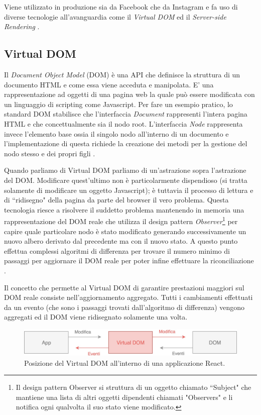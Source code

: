 Viene utilizzato in produzione sia da Facebook che da Instagram e fa uso di diverse tecnologie all'avanguardia come il \textit{Virtual DOM} ed il \textit{Server-side Rendering} \cite{WheelerOnReact}.

\subsection{Virtual DOM}
Il  \textit{Document Object Model} (DOM) è una API che definisce la struttura di un documento HTML e come essa viene acceduta e manipolata. E' una rappresentazione ad oggetti di una pagina web la quale può essere modificata con un linguaggio di scripting come Javascript.
Per fare un esempio pratico, lo standard DOM stabilisce che l'interfaccia \textit{Document} rappresenti l'intera pagina HTML e che concettualmente sia il nodo root. L'interfaccia \textit{Node} rappresenta invece l'elemento base ossia il singolo nodo all'interno di un documento e l'implementazione di questa richiede la creazione dei metodi per la gestione del nodo stesso e dei propri figli \cite{HWRWhatIsDOM}.

Quando parliamo di Virtual DOM parliamo di un'astrazione sopra l'astrazione del DOM. Modificare quest'ultimo non è particolarmente dispendioso (si tratta solamente di modificare un oggetto Javascript); è tuttavia il processo di lettura e di “ridisegno" della pagina da parte del browser il vero problema. Questa tecnologia riesce a risolvere il suddetto problema mantenendo in memoria una rappresentazione del DOM reale che utilizza il design pattern \textit{Observer}\footnote{Il design pattern Observer si struttura di un oggetto chiamato “Subject" che mantiene una lista di altri oggetti dipendenti chiamati "Observers" e li notifica ogni qualvolta il suo stato viene modificato.} per capire quale particolare nodo è stato modificato generando successivamente un nuovo albero derivato dal precedente ma con il nuovo stato. A questo punto effettua complessi algoritmi di differenza per trovare il numero minimo di passaggi per aggiornare il DOM reale per poter infine effettuare la riconciliazione \cite{MishraOnVirtualDOM}.

Il concetto che permette al Virtual DOM di garantire prestazioni maggiori sul DOM reale consiste nell'aggiornamento aggregato. Tutti i cambiamenti effettuati da un evento (che sono i passaggi trovati dall'algoritmo di differenza) vengono aggregati ed il DOM viene ridisegnato solamente una volta.

\begin{figure}[h]
\centering 
\vspace*{0.5cm}
\includegraphics[width=13cm]{./images/virtualDOMWorkflow}
\caption{Posizione del Virtual DOM all'interno di una applicazione React.}
\vspace*{0.5cm}
\end{figure}

